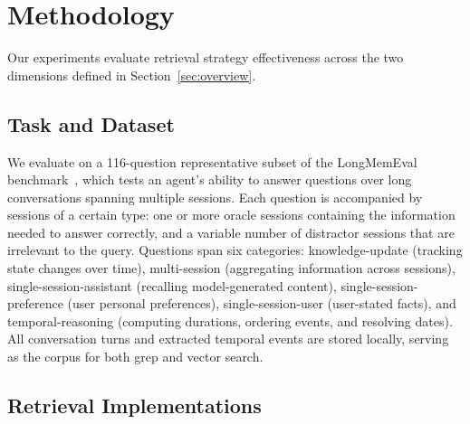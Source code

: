 \documentclass[sigconf,nonacm]{acmart}
\begin{document}
\section{Methodology}
\label{sec:method}
Our experiments evaluate retrieval strategy effectiveness across the two dimensions defined in Section~\ref{sec:overview}.


\subsection{Task and Dataset}
\label{sec:dataset}

We evaluate on a 116-question representative subset of the LongMemEval benchmark~\cite{longmemeval}, which tests an agent's ability to answer questions over long conversations spanning multiple sessions. Each question is accompanied by sessions of a certain type: one or more oracle sessions containing the information needed to answer correctly, and a variable number of distractor sessions that are irrelevant to the query. Questions span six categories: knowledge-update (tracking state changes over time), multi-session (aggregating information across sessions), single-session-assistant (recalling model-generated content), single-session-preference (user personal preferences), single-session-user (user-stated facts), and temporal-reasoning (computing durations, ordering events, and resolving dates). All conversation turns and extracted temporal events are stored locally, serving as the corpus for both grep and vector search.

\subsection{Retrieval Implementations}
\label{sec:retrieval}
\end{document}
